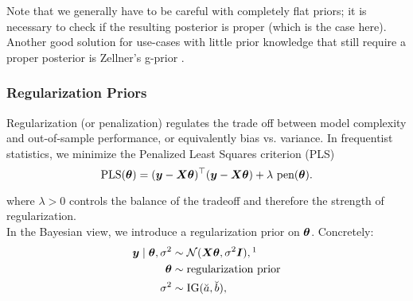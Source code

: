 Note that we generally have to be careful with completely flat priors; it is necessary to check if the resulting posterior is proper (which is the case here).\\

Another good solution for use-cases with little prior knowledge that still require a proper posterior is Zellner's g-prior \citep{zellner_assessing_1986}.

\subsubsection*{Regularization Priors} \label{sec:lm-regularization}

Regularization (or penalization) regulates the trade off between model complexity and out-of-sample performance, or equivalently bias vs. variance. 
In frequentist statistics, we minimize the Penalized Least Squares criterion (PLS) 
\begin{equation*}
    \text{PLS}(\btheta) = (\by - \bX \btheta)^\top (\by - \bX \btheta) + \lambda \ \text{pen}(\btheta).
\end{equation*}

where $\lambda > 0$ controls the balance of the tradeoff and therefore the strength of regularization.\\

In the Bayesian view, we introduce a regularization prior on $\bm{\theta}$.
Concretely:
\begin{equation}
    \begin{aligned}
        \by \mid \btheta, \ssd &\sim \Ncal(\bX \btheta, \ssd \bI),\footnotemark \\
        \btheta &\sim \text{regularization prior}\\
        \ssd &\sim \IG(\apri, \bpri),
    \end{aligned}
\end{equation}


